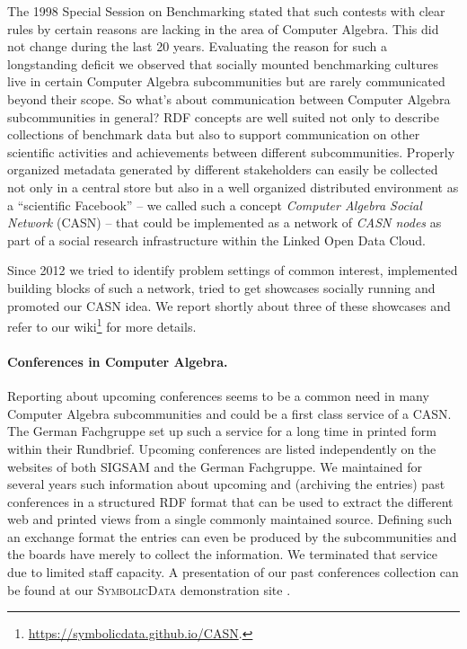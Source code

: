 \documentclass[a4paper,11pt]{article}
\def\SD{\textsc{SymbolicData}}
\begin{document}
The 1998 Special Session on Benchmarking stated that such contests with clear
rules by certain reasons are lacking in the area of Computer Algebra. This did
not change during the last 20 years.  Evaluating the reason for such a
longstanding deficit we observed that socially mounted benchmarking cultures
live in certain Computer Algebra subcommunities but are rarely communicated
beyond their scope. So what's about communication between Computer Algebra
subcommunities in general? RDF concepts are well suited not only to describe
collections of benchmark data but also to support communication on other
scientific activities and achievements between different subcommunities.
Properly organized metadata generated by different stakeholders can easily be
collected not only in a central store but also in a well organized distributed
environment as a ``scientific Facebook'' -- we called such a concept
\emph{Computer Algebra Social Network} (CASN) \cite{cicm-14} -- that could be
implemented as a network of \emph{CASN nodes} as part of a social research
infrastructure within the Linked Open Data Cloud.

Since 2012 we tried to identify problem settings of common interest,
implemented building blocks of such a network, tried to get showcases socially
running and promoted our CASN idea.  We report shortly about three of these
showcases and refer to our
wiki\footnote{\url{https://symbolicdata.github.io/CASN}.} for more details.

\paragraph{Conferences in Computer Algebra.}
Reporting about upcoming conferences seems to be a common need in many Computer
Algebra subcommunities and could be a first class service of a CASN. The German
Fachgruppe set up such a service for a long time in printed form within their
Rundbrief.  Upcoming conferences are listed independently on the websites of
both SIGSAM and the German Fachgruppe.  We maintained for several years such
information about upcoming and (archiving the entries) past conferences in a
structured RDF format that can be used to extract the different web and printed
views from a single commonly maintained source.  Defining such an exchange
format the entries can even be produced by the subcommunities and the boards
have merely to collect the information.  We terminated that service due to
limited staff capacity. A presentation of our past conferences collection can
be found at our {\SD} demonstration site \cite{sdinfo}.
\end{document}
